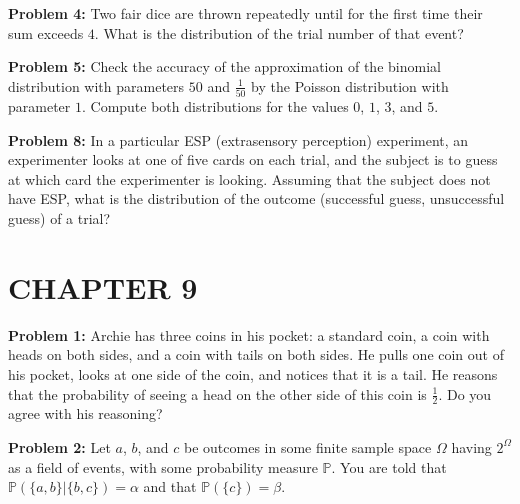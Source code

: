 \documentclass[12pt]{article}
\begin{document}
\vspace*{5cm}

\noindent
\textbf{Problem 4:} Two fair dice are thrown repeatedly until for the first time their sum exceeds $4$. What is the distribution of the trial number of that event?

\vspace*{5cm}

\noindent
\textbf{Problem 5:} Check the accuracy of the approximation of the binomial distribution with parameters $50$ and $\frac{1}{50}$ by the Poisson distribution with parameter $1$. Compute both distributions for the values $0$, $1$, $3$, and $5$.

\vspace*{5cm}

\noindent
\textbf{Problem 8:} In a particular ESP (extrasensory perception) experiment, an experimenter looks at one of five cards on each trial, and the subject is to guess at which card the experimenter is looking. Assuming that the subject does not have ESP, what is the distribution of the outcome (successful guess, unsuccessful guess) of a trial?

\vspace*{5cm}

\section*{CHAPTER 9}

\noindent
\textbf{Problem 1:} Archie has three coins in his pocket: a standard coin, a coin with heads on both sides, and a coin with tails on both sides. He pulls one coin out of his pocket, looks at one side of the coin, and notices that it is a tail. He reasons that the probability of seeing a head on the other side of this coin is $\frac{1}{2}$. Do you agree with his reasoning?

\vspace*{5cm}

\noindent
\textbf{Problem 2:} Let $a$, $b$, and $c$ be outcomes in some finite sample space $\Omega$ having $2^{\Omega}$ as a field of events, with some probability measure $\mathbb{P}$. You are told that $\mathbb{P}(\{ a,b \} \lvert \{ b,c \}) = \alpha$ and that $\mathbb{P}(\{ c \}) = \beta$.
\end{document}

